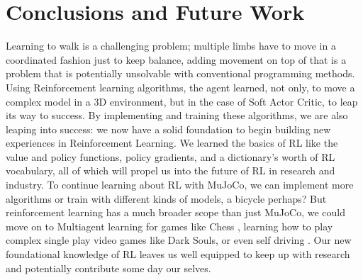 \documentclass[conference]{IEEEtran}
\begin{document}
\blindtext

\section{Conclusions and Future Work}

Learning to walk is a challenging problem; multiple limbs have to move in a coordinated fashion just to keep balance, adding movement on top of that is a problem that is potentially unsolvable with conventional programming methods. Using Reinforcement learning algorithms, the agent learned, not only, to move a complex model in a 3D environment, but in the case of Soft Actor Critic, to leap its way to success. By implementing and training these algorithms, we are also leaping into success: we now have a solid foundation to begin building new experiences in Reinforcement Learning. We learned the basics of RL like the value and policy functions, policy gradients, and a dictionary's worth of RL vocabulary, all of which will propel us into the future of RL in research and industry.
To continue learning about RL with MuJoCo, we can implement more algorithms or train with different kinds of models, a bicycle perhaps? But reinforcement learning has a much broader scope than just MuJoCo, we could move on to Multiagent learning for games like Chess \cite{multiagent}, learning how to play complex single play video games like Dark Souls, or even self driving \cite{self_driving}. Our new foundational knowledge of RL leaves us well equipped to keep up with research and potentially contribute some day our selves.



\end{document}
